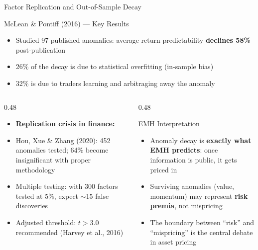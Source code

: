 \documentclass[9pt, aspectratio=169, t]{beamer}
\theoremstyle{definition}
\newenvironment{cminipage}[1]{%
    \par\noindent\hfill\begin{minipage}{#1}\ignorespaces
}{%
    \end{minipage}\hfill\null\par
}
\begin{document}
\begin{frame}{Factor Replication and Out-of-Sample Decay}
\begin{cminipage}{0.95\textwidth}
\begin{block}{McLean \& Pontiff (2016) --- Key Results}
\begin{itemize}\setlength{\itemsep}{0pt}
    \item Studied 97 published anomalies: average return predictability \textbf{declines 58\%} post-publication
    \item 26\% of the decay is due to statistical overfitting (in-sample bias)
    \item 32\% is due to traders learning and arbitraging away the anomaly
\end{itemize}
\end{block}

\begin{columns}[T]
\begin{column}{0.48\textwidth}
\begin{itemize}\setlength{\itemsep}{0pt}
    \item \textbf{Replication crisis in finance:}
    \item Hou, Xue \& Zhang (2020): 452 anomalies tested; 64\% become insignificant with proper methodology
    \item Multiple testing: with 300 factors tested at 5\%, expect $\sim$15 false discoveries
    \item Adjusted threshold: $t > 3.0$ recommended (Harvey et al., 2016)
\end{itemize}
\end{column}
\begin{column}{0.48\textwidth}
\begin{exampleblock}{EMH Interpretation}
\begin{itemize}\setlength{\itemsep}{0pt}
    \item Anomaly decay is \textbf{exactly what EMH predicts}: once information is public, it gets priced in
    \item Surviving anomalies (value, momentum) may represent \textbf{risk premia}, not mispricing
    \item The boundary between ``risk'' and ``mispricing'' is the central debate in asset pricing
\end{itemize}
\end{exampleblock}
\end{column}
\end{columns}
\end{cminipage}
\end{frame}
\end{document}
